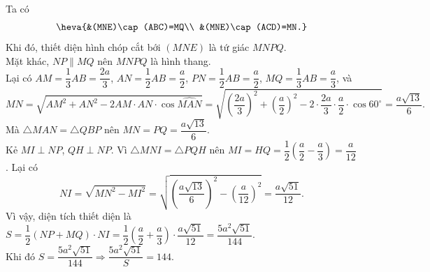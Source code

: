 \begin{ex}
{Ta  có
 $$\heva{&(MNE)\cap(ABC)=MQ\\
 &(MNE)\cap(ACD)=MN.}
$$ 
Khi đó, thiết diện hình chóp cắt bới $(MNE)$ là tứ  giác $MNPQ$.\\
 Mặt khác, $NP\parallel MQ$ nên $MNPQ$ là hình thang.\\
Lại có $AM=\dfrac{1}{3}AB=\dfrac{2a}{3}$, $AN=\dfrac{1}{2}AB=\dfrac{a}{2}$, $PN=\dfrac{1}{2}AB=\dfrac{a}{2}$,  $MQ=\dfrac{1}{3}AB=\dfrac{a}{3}$, và
 $$
MN=\sqrt{AM^2+AN^2-2AM\cdot AN\cdot\cos \widehat{MAN}}=\sqrt{\left(\dfrac{2 a}{3}\right)^2+\left(\dfrac{a}{2}\right)^2-2\cdot\dfrac{2a}{3}\cdot \dfrac{a}{2}\cdot\cos 60^\circ}=\dfrac{a\sqrt{13}}{6}.$$ 
Mà $\triangle MAN=\triangle QBP$  nên $MN=PQ=\dfrac{a\sqrt{13}}{6}$.\\
Kẻ  $MI\perp NP$, $QH\perp NP$. Vì $\triangle MNI=\triangle PQH$ nên $MI=HQ=\dfrac{1}{2}\left(\dfrac{a}{2}-\dfrac{a}{3}\right)=\dfrac{a}{12}$.
 Lại có
$$NI=\sqrt{MN^2-MI^2}=\sqrt{\left(\dfrac{a  \sqrt{13}}{6}\right)^2-\left(\dfrac{a}{12}\right)^2}=\dfrac{a\sqrt{51}}{12}.$$
Vì vậy, diện  tích thiết diện là $S=\dfrac{1}{2}(NP+MQ) \cdot NI=\dfrac{1}{2}\left(\dfrac{a}{2}+\dfrac{a}{3}\right) \cdot \dfrac{a \sqrt{51}}{12}=\dfrac{5a^2 \sqrt{51}}{144}$.\\
 Khi đó $S=\dfrac{5a^2\sqrt{51}}{144} \Rightarrow \dfrac{5a^2\sqrt{51}}{S}=144$.
} 
\end{ex}

